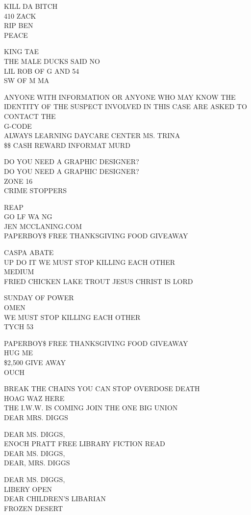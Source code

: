 \documentclass[10pt,letterpaper]{article}
\begin{document}
KILL DA BITCH\\
410 ZACK\\
RIP BEN\\
PEACE

KING TAE\\
THE MALE DUCKS SAID NO\\
LIL ROB OF G AND 54\\
SW OF M MA

ANYONE WITH INFORMATION OR ANYONE WHO MAY KNOW THE IDENTITY OF THE SUSPECT INVOLVED IN THIS CASE ARE ASKED TO CONTACT THE\\
G{-}CODE\\
ALWAYS LEARNING DAYCARE CENTER MS. TRINA\\
\$\$ CASH REWARD INFORMAT MURD

DO YOU NEED A GRAPHIC DESIGNER?\\
DO YOU NEED A GRAPHIC DESIGNER?\\
ZONE 16\\
CRIME STOPPERS

REAP\\
GO LF WA NG\\
JEN MCCLANING.COM\\
PAPERBOY\$ FREE THANKSGIVING FOOD GIVEAWAY

CASPA ABATE\\
UP DO IT WE MUST STOP KILLING EACH OTHER\\
MEDIUM\\
FRIED CHICKEN LAKE TROUT JESUS CHRIST IS LORD

SUNDAY OF POWER\\
OMEN\\
WE MUST STOP KILLING EACH OTHER\\
TYCH 53

PAPERBOY\$ FREE THANKSGIVING FOOD GIVEAWAY\\
HUG ME\\
\$2,500 GIVE AWAY\\
OUCH

BREAK THE CHAINS YOU CAN STOP OVERDOSE DEATH\\
HOAG WAZ HERE\\
THE I.W.W. IS COMING JOIN THE ONE BIG UNION\\
DEAR MRS. DIGGS

DEAR MS. DIGGS,\\
ENOCH PRATT FREE LIBRARY FICTION READ\\
DEAR MS. DIGGS,\\
DEAR, MRS. DIGGS

DEAR MS. DIGGS,\\
LIBERY OPEN\\
DEAR CHILDREN'S LIBARIAN\\
FROZEN DESERT
\end{document}
